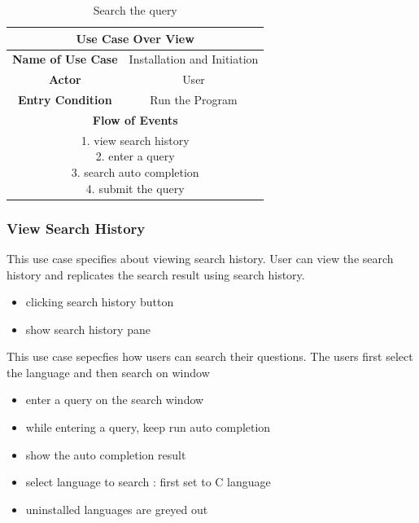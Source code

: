 \documentclass[conference]{IEEEtran}
\begin{document}
\begin{table}[hbt]
\renewcommand{\arraystretch}{1}
\caption{Search the query}
\label{table:usecase2}
\centering
\begin{adjustbox}{width=0.4\textwidth}
\small
\begin{tabular}{c|c}
\hline
\multicolumn{2}{c}{\textbf{Use Case Over View}} \\
\hline
\textbf{Name of Use Case} & Installation and Initiation \\
\hline
\textbf{Actor} & User \\
\hline
\textbf{Entry Condition} & Run the Program\\
\hline
\multicolumn{2}{c}{\textbf{Flow of Events}}\\
\hline
\multicolumn{2}{c}{
\parbox[t]{5cm}{
  1. view search history \\
  2. enter a query \\
  3. search auto completion \\
  4. submit the query
  }
}\\
\hline

\end{tabular}
\end{adjustbox}
\end{table}


\subsubsection{View Search History}
This use case specifies about viewing search history. User can view the search history and replicates the search result using search history.
\begin{itemize}
  \item clicking search history button
  \item show search history pane
\end{itemize}
\textit{}
This use case sepecfies how users can search their questions. The users first select the language and then search on window
\begin{itemize}
  \item enter a query on the search window
  \item while entering a query, keep run auto completion
  \item show the auto completion result
  \item select language to search : first set to C language
  \item uninstalled languages are greyed out
\end{itemize}
\textit{}
\end{document}
